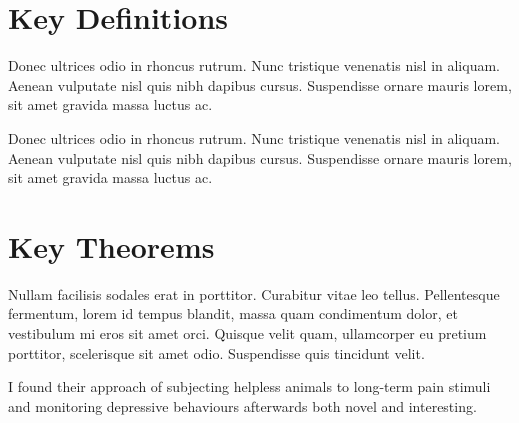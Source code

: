 \documentclass[10pt,letterpaper,twocolumn,landscape]{article}
\begin{document}

\section{Key Definitions}

\begin{defn}
Donec ultrices odio in rhoncus rutrum. Nunc tristique venenatis nisl in aliquam. Aenean vulputate nisl quis nibh dapibus cursus. Suspendisse ornare mauris lorem, sit amet gravida massa luctus ac. 
\end{defn}


\begin{defn}
Donec ultrices odio in rhoncus rutrum. Nunc tristique venenatis nisl in aliquam. Aenean vulputate nisl quis nibh dapibus cursus. Suspendisse ornare mauris lorem, sit amet gravida massa luctus ac. 
\end{defn}




\section{Key Theorems}

\begin{thm}
Nullam facilisis sodales erat in porttitor. Curabitur vitae leo tellus. Pellentesque fermentum, lorem id tempus blandit, massa quam condimentum dolor, et vestibulum mi eros sit amet orci. Quisque velit quam, ullamcorper eu pretium porttitor, scelerisque sit amet odio. Suspendisse quis tincidunt velit.
\end{thm}


\begin{nt}
I found their approach of subjecting helpless animals to long-term pain stimuli and monitoring depressive behaviours afterwards both novel and interesting.
\end{nt}



\end{document}
